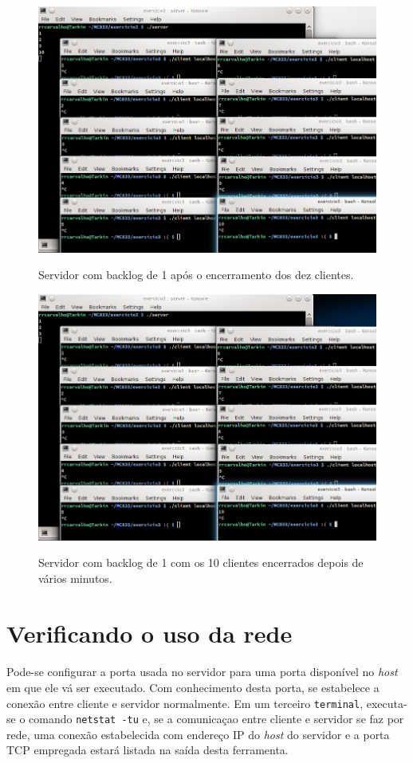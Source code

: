\documentclass[a4paper,10pt,oneside,final,titlepage,onecolumn]{article}
\begin{document}
\begin{figure}[!ht]
  \caption{Servidor com backlog de 1 após o encerramento dos dez clientes.}
  \centering
  \includegraphics[width=117mm]{images/multiplos6.png}
  \label{multiplos6}
\end{figure}
\begin{figure}[!ht]
  \caption{Servidor com backlog de 1 com os 10 clientes encerrados depois de vários minutos.}
  \centering
  \includegraphics[width=117mm]{images/multiplos7.png}
  \label{multiplos7}
\end{figure}



\FloatBarrier
\section{Verificando o uso da rede}
\paragraph{}Pode-se configurar a porta usada no servidor para uma porta disponível no \emph{host} em que ele vá ser executado. Com conhecimento desta porta, se estabelece a conexão entre cliente e servidor normalmente. Em um terceiro \verb|terminal|, executa-se o comando \verb|netstat -tu| e, se a comunicaçao entre cliente e servidor se faz por rede, uma conexão estabelecida com endereço IP do \emph{host} do servidor e a porta TCP empregada estará listada na saída desta ferramenta.
\end{document}
